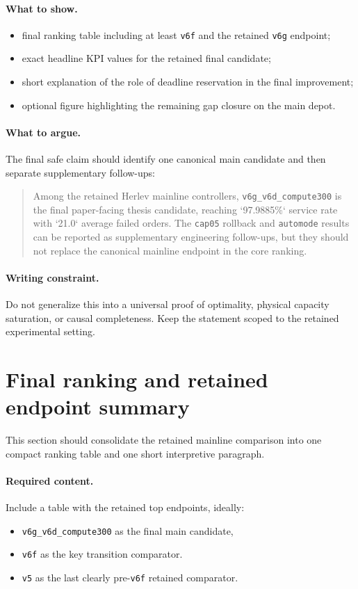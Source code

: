 \paragraph{What to show.}
\begin{itemize}
    \item final ranking table including at least \texttt{v6f} and the retained \texttt{v6g} endpoint;
    \item exact headline KPI values for the retained final candidate;
    \item short explanation of the role of deadline reservation in the final improvement;
    \item optional figure highlighting the remaining gap closure on the main depot.
\end{itemize}

\paragraph{What to argue.}
The final safe claim should identify one canonical main candidate and then separate supplementary follow-ups:
\begin{quote}
Among the retained Herlev mainline controllers, \texttt{v6g\_v6d\_compute300} is the final paper-facing thesis candidate, reaching `97.9885\%` service rate with `21.0` average failed orders.
The \texttt{cap05} rollback and \texttt{automode} results can be reported as supplementary engineering follow-ups, but they should not replace the canonical mainline endpoint in the core ranking.
\end{quote}

\paragraph{Writing constraint.}
Do not generalize this into a universal proof of optimality, physical capacity saturation, or causal completeness.
Keep the statement scoped to the retained experimental setting.

\section{Final ranking and retained endpoint summary}
\label{sec:results-final-ranking}

This section should consolidate the retained mainline comparison into one compact ranking table and one short interpretive paragraph.

\paragraph{Required content.}
Include a table with the retained top endpoints, ideally:
\begin{itemize}
    \item \texttt{v6g\_v6d\_compute300} as the final main candidate,
    \item \texttt{v6f} as the key transition comparator.
    \item \texttt{v5} as the last clearly pre-\texttt{v6f} retained comparator.
\end{itemize}


